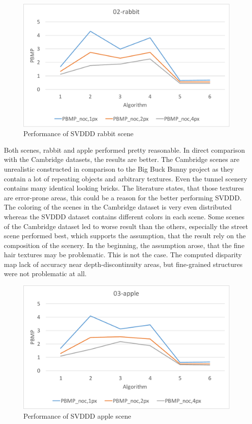 \begin{figure}[h!]
\centering
\includegraphics[width=1.0\textwidth]{src/images/evaluation/svddd/02-rabbit-plot.pdf}
\caption[Performance of SVDDD rabbit scene]{Performance of SVDDD rabbit scene}
\label{fig:eval-svddd-plot-rabbit}
\end{figure}

\noindent Both scenes, rabbit and apple performed pretty reasonable.
In direct comparison with the Cambridge datasets, the results are better.
The Cambridge scenes are unrealistic constructed in comparison to the Big Buck Bunny project as they contain a lot of repeating objects and arbitrary textures.
Even the tunnel scenery contains many identical looking bricks.
The literature states, that those textures are error-prone areas, this could be a reason for the better performing SVDDD.
The coloring of the scenes in the Cambridge dataset is very even distributed whereas the SVDDD dataset contains different colors in each scene.
Some scenes of the Cambridge dataset led to worse result than the others, especially the street scene performed best, which supports the assumption, that the result rely on the composition of the scenery.
In the beginning, the assumption arose, that the fine hair textures may be problematic.
This is not the case.
The computed disparity map lack of accuracy near depth-discontinuity areas, but fine-grained structures were not problematic at all.

\begin{figure}[h!]
\centering
\includegraphics[width=1.0\textwidth]{src/images/evaluation/svddd/03-apple-plot.pdf}
\caption[Performance of SVDDD apple scene]{Performance of SVDDD apple scene}
\label{fig:eval-svddd-plot-apple}
\end{figure}

